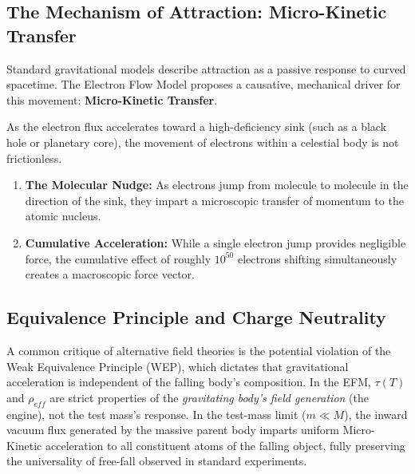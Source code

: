 \documentclass[11pt, a4paper]{article}
\begin{document}
\subsection{The Mechanism of Attraction: Micro-Kinetic Transfer}
Standard gravitational models describe attraction as a passive response to curved spacetime. The Electron Flow Model proposes a causative, mechanical driver for this movement: \textbf{Micro-Kinetic Transfer}.

As the electron flux accelerates toward a high-deficiency sink (such as a black hole or planetary core), the movement of electrons within a celestial body is not frictionless.
\begin{enumerate}
  \item \textbf{The Molecular Nudge:} As electrons jump from molecule to molecule in the direction of the sink, they impart a microscopic transfer of momentum to the atomic nucleus.
  \item \textbf{Cumulative Acceleration:} While a single electron jump provides negligible force, the cumulative effect of roughly $10^{50}$ electrons shifting simultaneously creates a macroscopic force vector.
\end{enumerate}

\subsection{Equivalence Principle and Charge Neutrality}
A common critique of alternative field theories is the potential violation of the Weak Equivalence Principle (WEP), which dictates that gravitational acceleration is independent of the falling body's composition. In the EFM, $\tau(T)$ and $\rho_{eff}$ are strict properties of the \textit{gravitating body's field generation} (the engine), not the test mass's response. In the test-mass limit ($m \ll M$), the inward vacuum flux generated by the massive parent body imparts uniform Micro-Kinetic acceleration to all constituent atoms of the falling object, fully preserving the universality of free-fall observed in standard experiments.
\end{document}
